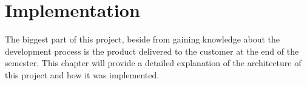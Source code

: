 \chapter{Implementation}

The biggest part of this project, beside from gaining knowledge about the development process is the product delivered to the customer at the end of the semester.
This chapter will provide a detailed explanation of the architecture of this project and how it was implemented.
\newpage

